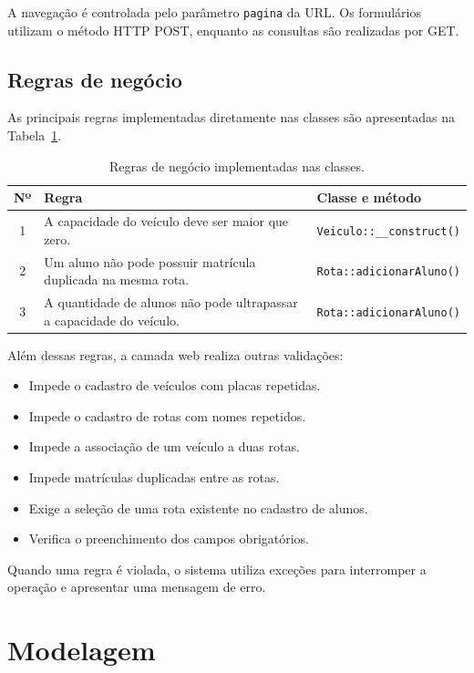 \documentclass[12pt,a4paper]{article}
\begin{document}
A navegação é controlada pelo parâmetro \texttt{pagina} da URL. Os formulários utilizam o método HTTP POST, enquanto as consultas são realizadas por GET.

\subsection{Regras de negócio}

As principais regras implementadas diretamente nas classes são apresentadas na Tabela~\ref{tab:regras}.

\begin{table}[H]
\centering
\small
\begin{tabularx}{\linewidth}{@{}cXX@{}}
\toprule
\textbf{Nº} & \textbf{Regra} & \textbf{Classe e método} \\
\midrule
1 & A capacidade do veículo deve ser maior que zero. &
\texttt{Veiculo::\_\_construct()} \\
2 & Um aluno não pode possuir matrícula duplicada na mesma rota. &
\texttt{Rota::adicionarAluno()} \\
3 & A quantidade de alunos não pode ultrapassar a capacidade do veículo. &
\texttt{Rota::adicionarAluno()} \\
\bottomrule
\end{tabularx}
\caption{Regras de negócio implementadas nas classes.}
\label{tab:regras}
\end{table}

Além dessas regras, a camada web realiza outras validações:

\begin{itemize}
    \item Impede o cadastro de veículos com placas repetidas.
    \item Impede o cadastro de rotas com nomes repetidos.
    \item Impede a associação de um veículo a duas rotas.
    \item Impede matrículas duplicadas entre as rotas.
    \item Exige a seleção de uma rota existente no cadastro de alunos.
    \item Verifica o preenchimento dos campos obrigatórios.
\end{itemize}

Quando uma regra é violada, o sistema utiliza exceções para interromper a operação e apresentar uma mensagem de erro.

\section{Modelagem}
\end{document}
